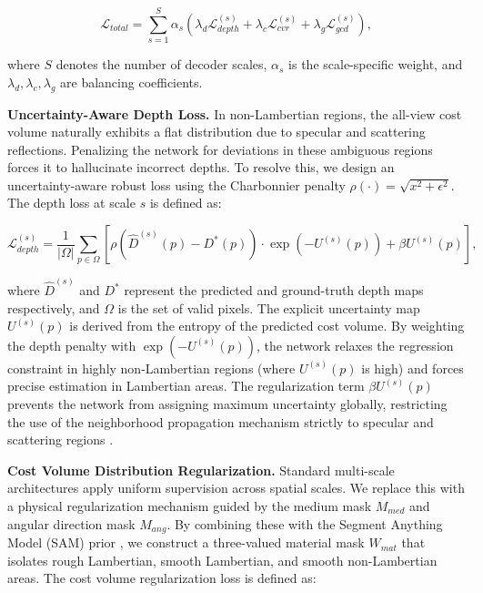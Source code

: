 \documentclass[lettersize,journal]{IEEEtran}
\begin{document}
\begin{equation}
\mathcal{L}_{total} = \sum_{s=1}^{S} \alpha_s \left( \lambda_{d} \mathcal{L}_{depth}^{(s)} + \lambda_{c} \mathcal{L}_{cvr}^{(s)} + \lambda_{g} \mathcal{L}_{gcd}^{(s)} \right),
\label{eq:total_loss}
\end{equation}

where $S$ denotes the number of decoder scales, $\alpha_s$ is the scale-specific weight, and $\lambda_{d}, \lambda_{c}, \lambda_{g}$ are balancing coefficients.

\textbf{Uncertainty-Aware Depth Loss.} 
In non-Lambertian regions, the all-view cost volume naturally exhibits a flat distribution due to specular and scattering reflections. Penalizing the network for deviations in these ambiguous regions forces it to hallucinate incorrect depths. To resolve this, we design an uncertainty-aware robust loss using the Charbonnier penalty $\rho(\cdot) = \sqrt{x^2 + \epsilon^2}$. The depth loss at scale $s$ is defined as:

\begin{equation}
\mathcal{L}_{depth}^{(s)} = \frac{1}{|\Omega|} \sum_{p \in \Omega} \left[ \rho\left(\hat{D}^{(s)}(p) - D^{*}(p)\right) \cdot \exp\left(-U^{(s)}(p)\right) + \beta U^{(s)}(p) \right],
\label{eq:depth_loss}
\end{equation}

where $\hat{D}^{(s)}$ and $D^{*}$ represent the predicted and ground-truth depth maps respectively, and $\Omega$ is the set of valid pixels. The explicit uncertainty map $U^{(s)}(p)$ is derived from the entropy of the predicted cost volume. By weighting the depth penalty with $\exp(-U^{(s)}(p))$, the network relaxes the regression constraint in highly non-Lambertian regions (where $U^{(s)}(p)$ is high) and forces precise estimation in Lambertian areas. The regularization term $\beta U^{(s)}(p)$ prevents the network from assigning maximum uncertainty globally, restricting the use of the neighborhood propagation mechanism strictly to specular and scattering regions \cite{li2021}.

\textbf{Cost Volume Distribution Regularization.} 
Standard multi-scale architectures \cite{eigen2014} apply uniform supervision across spatial scales. We replace this with a physical regularization mechanism guided by the medium mask $M_{med}$ and angular direction mask $M_{ang}$. By combining these with the Segment Anything Model (SAM) prior \cite{kirillov2023}, we construct a three-valued material mask $W_{mat}$ that isolates rough Lambertian, smooth Lambertian, and smooth non-Lambertian areas. The cost volume regularization loss is defined as:
\end{document}
